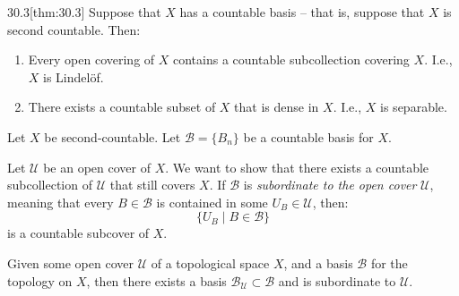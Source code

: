 \begin{thmBox}{30.3}[thm:30.3]
    Suppose that \( X \) has a countable basis -- that is, suppose that 
    \( X \) is second countable.
    Then:

    \begin{enumerate}[label = (\alph*)]
        \item Every open covering of \( X \) contains a countable subcollection
            covering \( X \).
            I.e., \( X \) is Lindel\"{o}f.
        \item There exists a countable subset of \( X \) that is dense in 
            \( X \).
            I.e., \( X \) is separable.
    \end{enumerate}

    \baseRule

    \begin{proofBox}
        Let \( X \) be second-countable.
        Let \( \mathcal{B} = \{ B_{ n } \} \) be a countable basis for \( X \).

        \baseSkip

        Let \( \mathcal{U} \) be an open cover of \( X \).
        We want to show that there exists a countable subcollection of 
        \( \mathcal{U} \) that still covers \( X \).
        If \( \mathcal{B} \) is \textit{subordinate to the open cover} 
        \( \mathcal{U} \), meaning that every \( B \in \mathcal{B} \) is 
        contained in some \( U_{ B } \in \mathcal{U} \), then:
        \begin{equation*}
            \{ U_{ B } \mid B \in \mathcal{B} \}
        \end{equation*}
        is a countable subcover of \( X \).

        \baseSkip

        Given some open cover \( \mathcal{U} \) of a topological space \( X \),
        and a basis \( \mathcal{B} \) for the topology on \( X \), then there
        exists a basis \( \mathcal{B}_{ \mathcal{U} } \subset \mathcal{B} \) and
        is subordinate to \( \mathcal{U} \).

        \baseSkip


\end{proofBox}
\end{thmBox}
